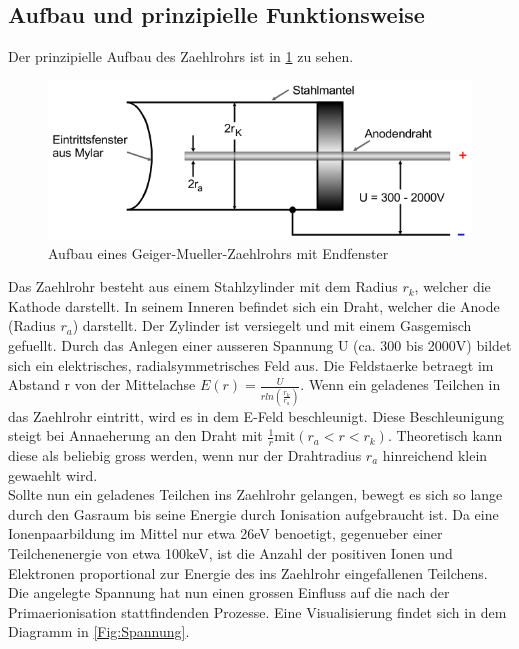 \documentclass[titlepage=firstcover, captions=tableheading]{scrartcl}
\begin{document}
\subsection{Aufbau und prinzipielle Funktionsweise}
Der prinzipielle Aufbau des Zaehlrohrs ist in \ref{Fig:Aufbau} zu sehen.
\begin{figure}[H]
    \centering
    \includegraphics{"Aufbau_Geiger.png"}
    \caption{Aufbau eines Geiger-Mueller-Zaehlrohrs mit Endfenster}
    \label{Fig:Aufbau}
\end{figure}
 Das Zaehlrohr besteht aus einem Stahlzylinder mit dem Radius $r_k$, welcher die Kathode darstellt. In seinem Inneren befindet sich ein Draht, welcher die Anode (Radius $r_a$) darstellt. Der Zylinder ist versiegelt und mit einem Gasgemisch gefuellt. Durch das Anlegen einer ausseren Spannung U (ca. 300 bis 2000V) bildet sich ein elektrisches, radialsymmetrisches Feld aus. Die Feldstaerke betraegt im Abstand r von der Mittelachse $E(r)=\frac{U}{rln(\frac{r_k}{r_a})}$.
 Wenn ein geladenes Teilchen in das Zaehlrohr eintritt, wird es in dem E-Feld beschleunigt. Diese Beschleunigung steigt bei Annaeherung an den Draht mit $\frac{1}{r} \text{mit} (r_a < r < r_k)$. Theoretisch kann diese als beliebig gross werden, wenn nur der Drahtradius $r_a$ hinreichend klein gewaehlt wird.\\
 Sollte nun ein geladenes Teilchen ins Zaehlrohr gelangen, bewegt es sich so lange durch den Gasraum bis seine Energie durch Ionisation aufgebraucht ist. Da eine Ionenpaarbildung im Mittel nur etwa 26eV benoetigt, gegenueber einer Teilchenenergie von etwa 100keV, ist die Anzahl der positiven Ionen und Elektronen proportional zur Energie des ins Zaehlrohr eingefallenen Teilchens. Die angelegte Spannung hat nun einen grossen Einfluss auf die nach der Primaerionisation stattfindenden Prozesse. Eine Visualisierung findet sich in dem Diagramm in \ref{Fig:Spannung}.
\end{document}
